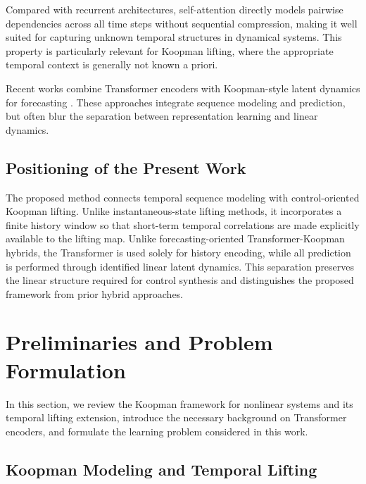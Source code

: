 \documentclass[journal]{IEEEtran}
\begin{document}
Compared with recurrent architectures, self-attention directly models pairwise dependencies across all time steps without sequential compression, making it well suited for capturing unknown temporal structures in dynamical systems. This property is particularly relevant for Koopman lifting, where the appropriate temporal context is generally not known a priori.

Recent works combine Transformer encoders with Koopman-style latent dynamics for forecasting \cite{forootani2026deepkoopformer, forootani2026spectral}. These approaches integrate sequence modeling and prediction, but often blur the separation between representation learning and linear dynamics.

\subsection{Positioning of the Present Work}
\label{subsec:positioning}

The proposed method connects temporal sequence modeling with control-oriented Koopman lifting. Unlike instantaneous-state lifting methods, it incorporates a finite history window so that short-term temporal correlations are made explicitly available to the lifting map. Unlike forecasting-oriented Transformer-Koopman hybrids, the Transformer is used solely for history encoding, while all prediction is performed through identified linear latent dynamics. This separation preserves the linear structure required for control synthesis and distinguishes the proposed framework from prior hybrid approaches.

\section{Preliminaries and Problem Formulation}
\label{sec:preliminaries_and_problem}

In this section, we review the Koopman framework for nonlinear systems and its temporal lifting extension, introduce the necessary background on Transformer encoders, and formulate the learning problem considered in this work.

\subsection{Koopman Modeling and Temporal Lifting}
\label{sec:preliminary}
\end{document}
